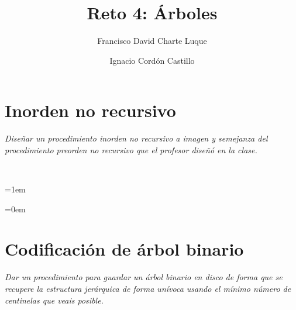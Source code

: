 \documentclass[a4paper,10pt]{scrartcl}
\title{Reto 4: Árboles}
\author{Francisco David Charte Luque\and
        Ignacio Cordón Castillo}
\date{}
\begin{document}
\maketitle
\section{Inorden no recursivo}
	\textit{Diseñar un procedimiento inorden no recursivo a imagen y semejanza
	del procedimiento preorden no recursivo que el profesor diseñó en la clase.}

 \ 
 
 \leftskip=1em
 \texttt{}
 
 \leftskip=0em
 \section{Codificación de árbol binario}
 	\textit{Dar un procedimiento para guardar un árbol binario en disco de forma que se
 	recupere la estructura jerárquica de forma unívoca usando el mínimo número
 	de centinelas que veais posible.}
\end{document}
